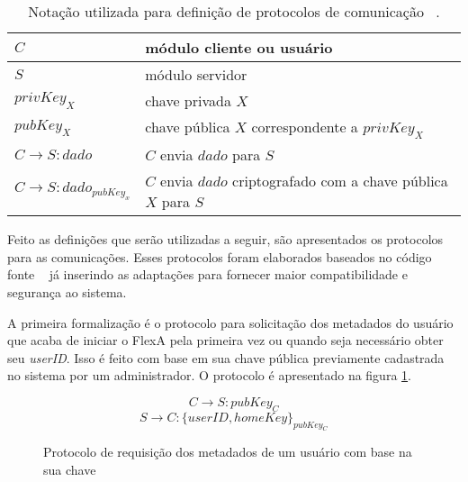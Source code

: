         \begin{table}
        
        \centering
        \begin{tabular}{|l|l|}
        \hline
        
        $C$ & módulo cliente ou usuário \\
        \hline
        $S$ & módulo servidor \\
        \hline
        $privKey_{X}$ & chave privada $X$ \\
        \hline
        $pubKey_{X}$ & chave pública $X$ correspondente a $privKey_{X}$\\
        \hline
        $C \rightarrow S : dado$ & $C$ envia $dado$ para $S$\\
        \hline
        $C \rightarrow S : {dado}_{pubKey_{x}}$ & $C$ envia $dado$ criptografado com a chave pública $X$ para $S$\\
        \hline
        
        \end{tabular}
        \caption{Notação utilizada para definição de protocolos de comunicação ~\cite{ross}.}
        \label{tab:notacao}
        \end{table}
        
        Feito as definições que serão utilizadas a seguir, são apresentados os protocolos para as comunicações. Esses protocolos foram elaborados baseados no código fonte ~\cite{mario} já inserindo as adaptações para fornecer maior compatibilidade e segurança ao sistema.





        
        A primeira formalização é o protocolo para solicitação dos metadados do usuário que acaba de iniciar o FlexA pela primeira vez ou quando seja necessário obter seu \textit{userID}. Isso é feito com base em sua chave pública previamente cadastrada no sistema por um administrador. O protocolo é apresentado na figura \ref{fig:proMetadadosUsuario}.
        
        \begin{figure}
        
        \[ C \rightarrow S: pubKey_{C} \]
        \[ S \rightarrow C: \{userID, homeKey\}_{pubKey_{C}} \]
        
        \caption{Protocolo de requisição dos metadados de um usuário com base na sua chave}
        \label{fig:proMetadadosUsuario}
        \end{figure}
        
